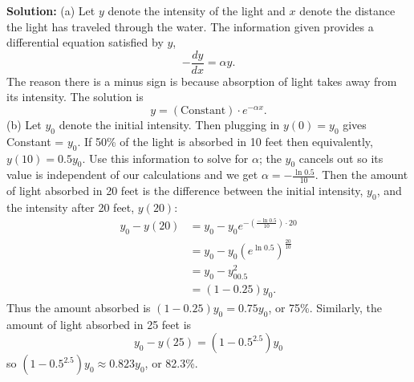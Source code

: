 \documentclass[11pt,letterpaper]{article}
\begin{document}
\begin{enumerate}
{\bf Solution:} (a) Let $y$ denote the intensity of the light and $x$ denote the distance the light has traveled through the water.  The information given provides a differential equation satisfied by $y$,
\[-\frac{dy}{dx}=\alpha y.\]
The reason there is a minus sign is because absorption of light takes away from its intensity.  The solution is 
\[y=(\text{Constant})\cdot e^{-\alpha x}.\]
(b) Let $y_0$ denote the initial intensity.  Then plugging in $y(0)=y_0$ gives Constant = $y_0$.  If 50\% of the light is absorbed in 10 feet then equivalently, $y(10)=0.5y_0$.  Use this information to solve for $\alpha$; the $y_0$ cancels out so its value is independent of our calculations and we get $\alpha=-\frac{\ln{0.5}}{10}$.  Then the amount of light absorbed in 20 feet is the difference between the initial intensity, $y_0$, and the intensity after 20 feet, $y(20)$:
\begin{align*}
y_0-y(20) &= y_0-y_0e^{-\left(\frac{-\ln{0.5}}{10}\right)\cdot 20} \\
&= y_0-y_0\left(e^{\ln{0.5}}\right)^{\frac{20}{10}} \\
&= y_0-y_00.5^2 \\
&=(1-0.25)y_0. 
\end{align*}
Thus the amount absorbed is $(1-0.25)y_0=0.75y_0$, or 75\%.  Similarly, the amount of light absorbed in 25 feet is
\[y_0-y(25)=(1-0.5^{2.5})y_0\]
so $(1-0.5^{2.5})y_0\approx 0.823y_0$, or 82.3\%.

\end{enumerate}
\end{document}
